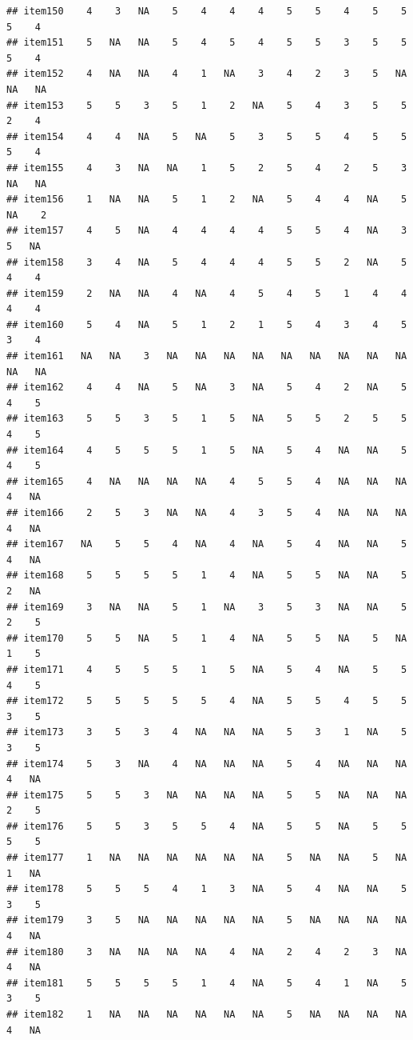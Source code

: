 \documentclass[
  man]{apa6}
\begin{document}
\begin{verbatim}
## item150    4    3   NA    5    4    4    4    5    5    4    5    5    5    4
## item151    5   NA   NA    5    4    5    4    5    5    3    5    5    5    4
## item152    4   NA   NA    4    1   NA    3    4    2    3    5   NA   NA   NA
## item153    5    5    3    5    1    2   NA    5    4    3    5    5    2    4
## item154    4    4   NA    5   NA    5    3    5    5    4    5    5    5    4
## item155    4    3   NA   NA    1    5    2    5    4    2    5    3   NA   NA
## item156    1   NA   NA    5    1    2   NA    5    4    4   NA    5   NA    2
## item157    4    5   NA    4    4    4    4    5    5    4   NA    3    5   NA
## item158    3    4   NA    5    4    4    4    5    5    2   NA    5    4    4
## item159    2   NA   NA    4   NA    4    5    4    5    1    4    4    4    4
## item160    5    4   NA    5    1    2    1    5    4    3    4    5    3    4
## item161   NA   NA    3   NA   NA   NA   NA   NA   NA   NA   NA   NA   NA   NA
## item162    4    4   NA    5   NA    3   NA    5    4    2   NA    5    4    5
## item163    5    5    3    5    1    5   NA    5    5    2    5    5    4    5
## item164    4    5    5    5    1    5   NA    5    4   NA   NA    5    4    5
## item165    4   NA   NA   NA   NA    4    5    5    4   NA   NA   NA    4   NA
## item166    2    5    3   NA   NA    4    3    5    4   NA   NA   NA    4   NA
## item167   NA    5    5    4   NA    4   NA    5    4   NA   NA    5    4   NA
## item168    5    5    5    5    1    4   NA    5    5   NA   NA    5    2   NA
## item169    3   NA   NA    5    1   NA    3    5    3   NA   NA    5    2    5
## item170    5    5   NA    5    1    4   NA    5    5   NA    5   NA    1    5
## item171    4    5    5    5    1    5   NA    5    4   NA    5    5    4    5
## item172    5    5    5    5    5    4   NA    5    5    4    5    5    3    5
## item173    3    5    3    4   NA   NA   NA    5    3    1   NA    5    3    5
## item174    5    3   NA    4   NA   NA   NA    5    4   NA   NA   NA    4   NA
## item175    5    5    3   NA   NA   NA   NA    5    5   NA   NA   NA    2    5
## item176    5    5    3    5    5    4   NA    5    5   NA    5    5    5    5
## item177    1   NA   NA   NA   NA   NA   NA    5   NA   NA    5   NA    1   NA
## item178    5    5    5    4    1    3   NA    5    4   NA   NA    5    3    5
## item179    3    5   NA   NA   NA   NA   NA    5   NA   NA   NA   NA    4   NA
## item180    3   NA   NA   NA   NA    4   NA    2    4    2    3   NA    4   NA
## item181    5    5    5    5    1    4   NA    5    4    1   NA    5    3    5
## item182    1   NA   NA   NA   NA   NA   NA    5   NA   NA   NA   NA    4   NA

\end{verbatim}
\end{document}
